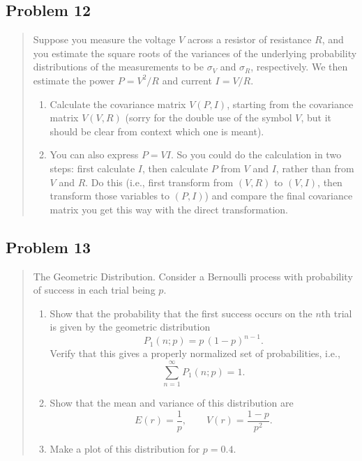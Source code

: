 \subsection*{Problem 12}
\begin{quote}
Suppose you measure the voltage $V$ across a resistor of resistance $R$, and you estimate the square roots of the variances of the underlying probability distributions of the measurements to be $\sigma_V$ and $\sigma_R$, respectively. We then estimate the power $P=V^2/R$ and current $I=V/R$.
\begin{enumerate}[label=(\alph*)]
	\item Calculate the covariance matrix $V(P,I)$, starting from the covariance matrix $V(V,R)$ (sorry for the double use of the symbol $V$, but it should be clear from context which one is meant).
	\item You can also express $P=VI$. So you could do the calculation in two steps: first calculate $I$, then calculate $P$ from $V$ and $I$, rather than from $V$ and $R$. Do this (i.e., first transform from $(V,R)$ to $(V,I)$, then transform those variables to $(P,I)$) and compare the final covariance matrix you get this way with the direct transformation.
\end{enumerate}
\end{quote}

\subsection*{Problem 13}
\begin{quote}
The Geometric Distribution. Consider a Bernoulli process with probability of success in each trial being $p$.
\begin{enumerate}[label=(\alph*)]
	\item Show that the probability that the first success occurs on the $n$th trial is given by the geometric distribution
	\[
		P_1(n;p) = p\,(1-p)^{n-1}.
	\]
	Verify that this gives a properly normalized set of probabilities, i.e.,
	\[
		\sum_{n=1}^{\infty} P_1(n;p) = 1.
	\]
	\item Show that the mean and variance of this distribution are
	\[
		E(r)=\frac{1}{p}, \qquad V(r)=\frac{1-p}{p^2}.
	\]
	\item Make a plot of this distribution for $p=0.4$.
\end{enumerate}
\end{quote}


